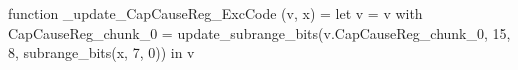 function _update_CapCauseReg_ExcCode (v, x) = let v = { v with CapCauseReg_chunk_0 = update_subrange_bits(v.CapCauseReg_chunk_0, 15, 8, subrange_bits(x, 7, 0)) } in
  v
